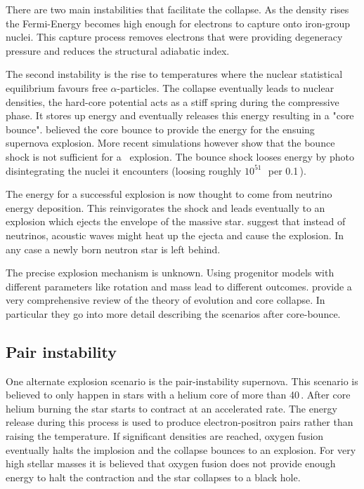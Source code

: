 There are two main instabilities that facilitate the collapse. As the density rises the Fermi-Energy becomes high enough for electrons to capture onto iron-group nuclei. This capture process removes electrons that were providing degeneracy pressure and reduces the structural adiabatic index. 

The second instability is the rise to temperatures where the nuclear statistical equilibrium favours free $\alpha$-particles. The collapse eventually leads to nuclear densities, the hard-core potential acts as a stiff spring during the compressive phase. It stores up energy and eventually releases this energy resulting in a "core bounce".  
\citet{1985PhRvL..55..126B,1987PhRvL..59..736B} believed the core bounce to provide the energy for the ensuing supernova explosion. More recent simulations however show that the bounce shock is not sufficient for a \snii\ explosion. The bounce shock looses energy by photo disintegrating the nuclei it encounters (loosing roughly $10^{51}$\,\erg\ per 0.1\,\msun).

The energy for a successful explosion is now thought to come from neutrino energy deposition. This reinvigorates the shock and leads eventually to an explosion which ejects the envelope of the massive star. \cite{2007ApJ...655..416B} suggest that instead of neutrinos, acoustic waves might heat up the ejecta and cause the explosion. In any case a newly born neutron star is left behind.

The precise explosion mechanism is unknown. Using progenitor models with different parameters like rotation and mass lead to different outcomes. \citet{2002RvMP...74.1015W} provide a very comprehensive review of the theory of evolution and core collapse. In particular they go into more detail describing the scenarios after core-bounce.

\subsection{Pair instability}
One alternate explosion scenario is the pair-instability supernova. This scenario is believed to only happen in stars with a helium core of more than 40\,\msun. After core helium burning the star starts to contract at an accelerated rate. The energy release during this process is used to produce electron-positron pairs rather than raising the temperature. If significant densities are reached, oxygen fusion eventually halts the implosion and the collapse bounces to an explosion. For very high stellar masses it is believed that oxygen fusion does not provide enough energy to halt the contraction and the star collapses to a black hole.


